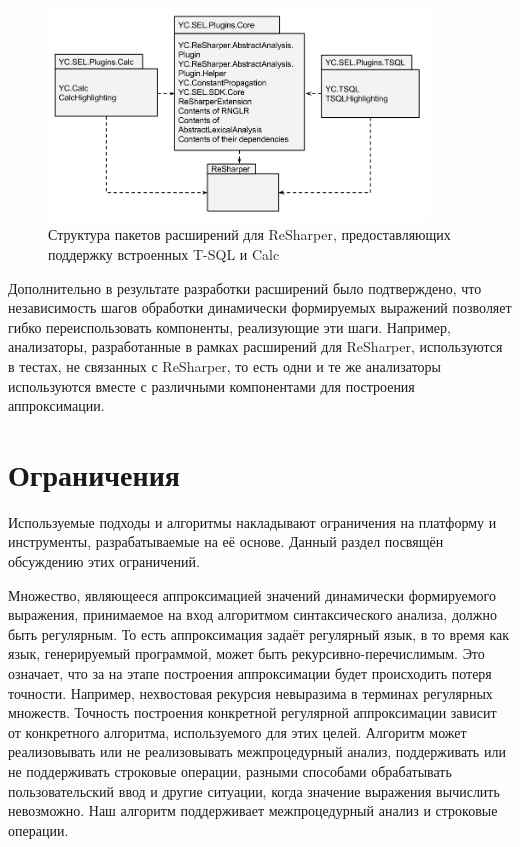 \begin{figure}[H]
  \centering
 \includegraphics[width=0.90\textwidth]{pics/RshPluginsPackages.png}
 \caption{Структура пакетов расширений для ReSharper, предоставляющих поддержку встроенных T-SQL и Calc}
 \label{fig:packagesStructure}
\end{figure}

Дополнительно в результате разработки расширений было подтверждено, что независимость шагов обработки динамически формируемых выражений позволяет гибко переиспользовать компоненты, реализующие эти шаги. Например, анализаторы, разработанные в рамках расширений для ReSharper, используются в тестах, не связанных с ReSharper, то есть одни и те же анализаторы используются вместе с различными компонентами для построения аппроксимации.

\section{Ограничения}

Используемые подходы и алгоритмы накладывают ограничения на платформу и инструменты, разрабатываемые на её основе. Данный раздел посвящён обсуждению этих ограничений.

Множество, являющееся аппроксимацией значений динамически формируемого выражения, принимаемое на вход алгоритмом синтаксического анализа, должно быть регулярным. То есть аппроксимация задаёт регулярный язык, в то время как язык, генерируемый программой, может быть рекурсивно-перечислимым. Это означает, что за на этапе построения аппроксимации будет происходить потеря точности. Например, нехвостовая рекурсия невыразима в терминах регулярных множеств. Точность построения конкретной регулярной аппроксимации зависит от конкретного алгоритма, используемого для этих целей. Алгоритм может реализовывать или не реализовывать межпроцедурный анализ, поддерживать или не поддерживать строковые операции, разными способами обрабатывать пользовательский ввод и другие ситуации, когда значение выражения вычислить невозможно. Наш алгоритм поддерживает межпроцедурный анализ и строковые операции. 

